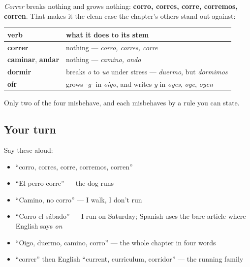 \begin{grammarlens}[title={Grammar Lens: a plain -er verb, and four verbs together}]
\emph{Correr} breaks nothing and grows nothing: \textbf{corro, corres, corre, corremos, corren}. That makes it the clean case the chapter's others stand out against:

\noindent
\begin{tabularx}{\linewidth}{@{}>{\raggedright\arraybackslash}X>{\raggedright\arraybackslash}X@{}}
\toprule
\textbf{verb} & \textbf{what it does to its stem} \\
\midrule
\textbf{correr} & nothing — \emph{corro, corres, corre} \\
\textbf{caminar}, \textbf{andar} & nothing — \emph{camino, ando} \\
\textbf{dormir} & breaks \emph{o} to \emph{ue} under stress — \emph{duermo}, but \emph{dormimos} \\
\textbf{oír} & grows \emph{-g-} in \emph{oigo}, and writes \emph{y} in \emph{oyes}, \emph{oye}, \emph{oyen} \\
\bottomrule
\end{tabularx}

Only two of the four misbehave, and each misbehaves by a rule you can state.
\end{grammarlens}

\subsection*{Your turn}
Say these aloud:

\begin{itemize}
\raggedright
  \item \textquotedblleft{}corro, corres, corre, corremos, corren\textquotedblright{}
  \item \textquotedblleft{}El perro corre\textquotedblright{} — the dog runs
  \item \textquotedblleft{}Camino, no corro\textquotedblright{} — I walk, I don't run
  \item \textquotedblleft{}Corro el sábado\textquotedblright{} — I run on Saturday; Spanish uses the bare article where English says \emph{on}
  \item \textquotedblleft{}Oigo, duermo, camino, corro\textquotedblright{} — the whole chapter in four words
  \item \textquotedblleft{}correr\textquotedblright{} then English \textquotedblleft{}current, curriculum, corridor\textquotedblright{} — the running family
\end{itemize}

